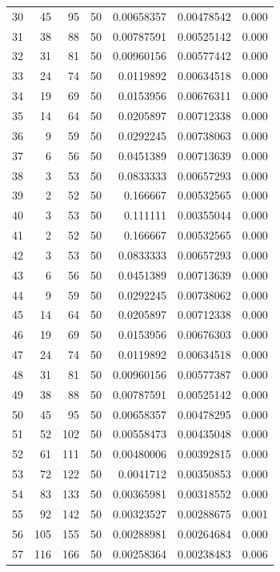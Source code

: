 \begin{tabular}{r r r r r r r}
30 & 45 & 95 & 50 & 0.00658357 & 0.00478542 & 0.000 \\
31 & 38 & 88 & 50 & 0.00787591 & 0.00525142 & 0.000 \\
32 & 31 & 81 & 50 & 0.00960156 & 0.00577442 & 0.000 \\
33 & 24 & 74 & 50 & 0.0119892 & 0.00634518 & 0.000 \\
34 & 19 & 69 & 50 & 0.0153956 & 0.00676311 & 0.000 \\
35 & 14 & 64 & 50 & 0.0205897 & 0.00712338 & 0.000 \\
36 & 9 & 59 & 50 & 0.0292245 & 0.00738063 & 0.000 \\
37 & 6 & 56 & 50 & 0.0451389 & 0.00713639 & 0.000 \\
38 & 3 & 53 & 50 & 0.0833333 & 0.00657293 & 0.000 \\
39 & 2 & 52 & 50 & 0.166667 & 0.00532565 & 0.000 \\
40 & 3 & 53 & 50 & 0.111111 & 0.00355044 & 0.000 \\
41 & 2 & 52 & 50 & 0.166667 & 0.00532565 & 0.000 \\
42 & 3 & 53 & 50 & 0.0833333 & 0.00657293 & 0.000 \\
43 & 6 & 56 & 50 & 0.0451389 & 0.00713639 & 0.000 \\
44 & 9 & 59 & 50 & 0.0292245 & 0.00738062 & 0.000 \\
45 & 14 & 64 & 50 & 0.0205897 & 0.00712338 & 0.000 \\
46 & 19 & 69 & 50 & 0.0153956 & 0.00676303 & 0.000 \\
47 & 24 & 74 & 50 & 0.0119892 & 0.00634518 & 0.000 \\
48 & 31 & 81 & 50 & 0.00960156 & 0.00577387 & 0.000 \\
49 & 38 & 88 & 50 & 0.00787591 & 0.00525142 & 0.000 \\
50 & 45 & 95 & 50 & 0.00658357 & 0.00478295 & 0.000 \\
51 & 52 & 102 & 50 & 0.00558473 & 0.00435048 & 0.000 \\
52 & 61 & 111 & 50 & 0.00480006 & 0.00392815 & 0.000 \\
53 & 72 & 122 & 50 & 0.0041712 & 0.00350853 & 0.000 \\
54 & 83 & 133 & 50 & 0.00365981 & 0.00318552 & 0.000 \\
55 & 92 & 142 & 50 & 0.00323527 & 0.00288675 & 0.001 \\
56 & 105 & 155 & 50 & 0.00288981 & 0.00264684 & 0.000 \\
57 & 116 & 166 & 50 & 0.00258364 & 0.00238483 & 0.006 \\

\end{tabular}
